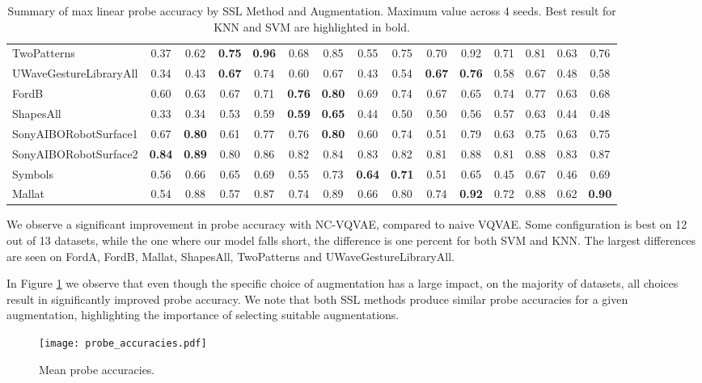 \documentclass[../../thesis.tex]{subfiles}
\begin{document}
\begin{table}[H]
\begin{adjustbox}{width=\textwidth}
\begin{tabular}{lcc|cc|cc|cc|cc|cc|cc}
        TwoPatterns             & 0.37 & 0.62 & \textbf{0.75} & \textbf{0.96} & 0.68 & 0.85 & 0.55 & 0.75 & 0.70 & 0.92 & 0.71 & 0.81 & 0.63 & 0.76 \\
        UWaveGestureLibraryAll  & 0.34 & 0.43 & \textbf{0.67} & 0.74 & 0.60 & 0.67 & 0.43 & 0.54 & \textbf{0.67} & \textbf{0.76} & 0.58 & 0.67 & 0.48 & 0.58 \\
        FordB                   & 0.60 & 0.63 & 0.67 & 0.71 & \textbf{0.76} & \textbf{0.80} & 0.69 & 0.74 & 0.67 & 0.65 & 0.74 & 0.77 & 0.63 & 0.68 \\
        ShapesAll               & 0.33 & 0.34 & 0.53 & 0.59 & \textbf{0.59} & \textbf{0.65} & 0.44 & 0.50 & 0.50 & 0.56 & 0.57 & 0.63 & 0.44 & 0.48 \\
        SonyAIBORobotSurface1   & 0.67 & \textbf{0.80} & 0.61 & 0.77 & 0.76 & \textbf{0.80} & 0.60 & 0.74 & 0.51 & 0.79 & 0.63 & 0.75 & 0.63 & 0.75 \\
        SonyAIBORobotSurface2   & \textbf{0.84} & \textbf{0.89} & 0.80 & 0.86 & 0.82 & 0.84 & 0.83 & 0.82 & 0.81 & 0.88 & 0.81 & 0.88 & 0.83 & 0.87 \\
        Symbols                 & 0.56 & 0.66 & 0.65 & 0.69 & 0.55 & 0.73 & \textbf{0.64} & \textbf{0.71} & 0.51 & 0.65 & 0.45 & 0.67 & 0.46 & 0.69 \\
        Mallat                  & 0.54 & 0.88 & 0.57 & 0.87 & 0.74 & 0.89 & 0.66 & 0.80 & 0.74 & \textbf{0.92} & 0.72 & 0.88 & 0.62 & \textbf{0.90} \\


        \bottomrule
    \end{tabular}
    \end{adjustbox}
    
    \caption{Summary of max linear probe accuracy by SSL Method and Augmentation. Maximum value across 4 seeds. Best result for KNN and SVM are highlighted in bold.}
    \label{tab:best_probe}
\end{table}

We observe a significant improvement in probe accuracy with NC-VQVAE, compared to naive VQVAE. Some configuration is best on 12 out of 13 datasets, while the one where our model falls short, the difference is one percent for both SVM and KNN. The largest differences are seen on FordA, FordB, Mallat, ShapesAll, TwoPatterns and UWaveGestureLibraryAll.\newline

In Figure \ref{fig:Mean_probe} we observe that even though the specific choice of augmentation has a large impact, on the majority of datasets, all choices result in significantly improved probe accuracy. We note that both SSL methods produce similar probe accuracies for a given augmentation, highlighting the importance of selecting suitable augmentations. \newline
\begin{figure}[h]
    \texttt{[image: probe\_accuracies.pdf]}
    \centering  
    \caption{Mean probe accuracies.}
    \label{fig:Mean_probe}
\end{figure}
\end{document}
